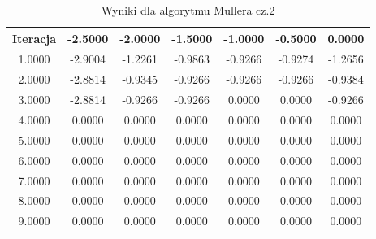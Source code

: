 \documentclass[a4paper, 11pt]{article}
\begin{document}
\begin{enumerate}
\begin{itemize}
\begin{table}                                                        
\centering                                                           
\begin{tabular}{|c|c|c|c|c|c|c|}                                     
\hline                                                               
Iteracja & -2.5000 & -2.0000 & -1.5000 & -1.0000 & -0.5000 & 0.0000 \\ 
\hline                                                               
1.0000 & -2.9004 & -1.2261 & -0.9863 & -0.9266 & -0.9274 & -1.2656 \\
\hline                                                               
2.0000 & -2.8814 & -0.9345 & -0.9266 & -0.9266 & -0.9266 & -0.9384 \\
\hline                                                               
3.0000 & -2.8814 & -0.9266 & -0.9266 & 0.0000 & 0.0000 & -0.9266 \\  
\hline                                                               
4.0000 & 0.0000 & 0.0000 & 0.0000 & 0.0000 & 0.0000 & 0.0000 \\      
\hline                                                               
5.0000 & 0.0000 & 0.0000 & 0.0000 & 0.0000 & 0.0000 & 0.0000 \\      
\hline                                                               
6.0000 & 0.0000 & 0.0000 & 0.0000 & 0.0000 & 0.0000 & 0.0000 \\      
\hline                                                               
7.0000 & 0.0000 & 0.0000 & 0.0000 & 0.0000 & 0.0000 & 0.0000 \\      
\hline                                                               
8.0000 & 0.0000 & 0.0000 & 0.0000 & 0.0000 & 0.0000 & 0.0000 \\      
\hline                                                               
9.0000 & 0.0000 & 0.0000 & 0.0000 & 0.0000 & 0.0000 & 0.0000 \\     
\hline                                                               
\end{tabular}     
\caption{Wyniki dla algorytmu Mullera cz.2}                                                                                                                                                                                          
\label{table:Wyniki dla algorytmu Mullera}                                                                                                                                                                                        
\end{table}                                                                                                                                                                                                       


\end{itemize}
\end{enumerate}
\end{document}
